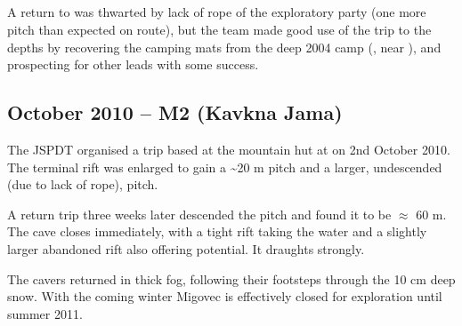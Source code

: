 \subsection{}

A return to  was thwarted by lack of rope of the exploratory party (one more pitch than expected on route), but the team made good use of the trip to the depths by recovering the camping mats from the deep 2004 camp (, near ), and prospecting for other leads with some success.

\subsection{October 2010 -- M2 (Kavkna Jama)}

The JSPDT organised a trip based at the mountain hut at  on 2nd
October 2010. The terminal rift was enlarged to gain a
\textasciitilde 20 m pitch and a larger, undescended (due to lack of rope), pitch.

A return trip three weeks later descended the pitch and found it to be
\(\approx\) 60 m. The cave closes immediately, with a tight rift taking
the water and a slightly larger abandoned rift also offering potential.
It draughts strongly.

The  cavers returned in thick fog, following their footsteps
through the 10 cm deep snow. With the coming winter Migovec is
effectively closed for exploration until summer 2011.



